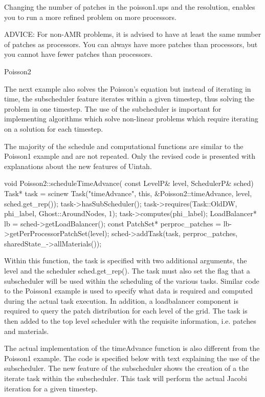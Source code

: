 \documentclass[12pt]{report}
\begin{document}
Changing the number of patches in the poisson1.ups and the resolution, enables you to run a more refined problem on more processors.  

ADVICE: For non-AMR problems, it is advised to have at least the same number of patches as processors.  You can always have more patches than processors, but you cannot have fewer patches than processors.


Poisson2

The next example also solves the Poisson's equation but instead of iterating in time, the subscheduler feature iterates within a given timestep, thus solving the problem in one timestep.  The use of the subcheduler is important for implementing algorithms which solve non-linear problems which require iterating on a solution for each timestep.

The majority of the schedule and computational functions are similar to the Poisson1 example and are not repeated.  Only the revised code is presented with explanations about the new features of Uintah.

void Poisson2::scheduleTimeAdvance( const LevelP& level, SchedulerP& sched)
{
  Task* task = scinew Task("timeAdvance",
			this, &Poisson2::timeAdvance,
			level, sched.get_rep());
  task->hasSubScheduler();
  task->requires(Task::OldDW, phi_label, Ghost::AroundNodes, 1);
  task->computes(phi_label);
  LoadBalancer* lb = sched->getLoadBalancer();
  const PatchSet* perproc_patches = lb->getPerProcessorPatchSet(level);
  sched->addTask(task, perproc_patches, sharedState_->allMaterials());
}

Within this function, the task is specified with two additional arguments, the level and the scheduler sched.get_rep().  The task must also set the flag that a subscheduler will be used within the scheduling of the various tasks.  Similar code to the Poisson1 example is used to specify what data is required and computed during the actual task execution.  In addition, a loadbalancer component is required to query the patch distribution for each level of the grid.  The task is then added to the top level scheduler with the requisite information, i.e. patches and materials.

The actual implementation of the timeAdvance function is also different from the Poisson1 example.  The code is specified below with text explaining the use of the subscheduler.  The new feature of the subscheduler shows the creation of a the iterate task within the subscheduler.  This task will perform the actual Jacobi iteration for a given timestep.
\end{document}
